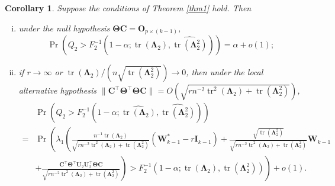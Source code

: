 \documentclass[12pt]{article} %
\DeclareMathOperator{\mytr}{tr}
\newcommand{\bC}{\mathbf{C}}
\newcommand{\bO}{\mathbf{O}}
\newcommand{\bI}{\mathbf{I}}
\newcommand{\bU}{\mathbf{U}}
\newcommand{\bW}{\mathbf{W}}
\newcommand{\bfsym}[1]{\ensuremath{\boldsymbol{#1}}}
\def\bLambda {\bfsym {\Lambda}}
\def\bTheta {\bfsym {\Theta}}
\newtheorem{corollary}{Corollary}
\theoremstyle{definition}
\begin{document}
\begin{corollary}
    Suppose the conditions of Theorem \ref{thm1} hold.
    Then
    \begin{enumerate}[(i)]
        \item 
            under the null hypothesis $\bTheta \bC=\bO_{p\times (k-1)}$,
\begin{equation*}
    \Pr
    \left(
        Q_2
    >
    F_2^{-1}\left(1-\alpha;\widehat{\mytr(\bLambda_2)},\widehat{\mytr(\bLambda_2^2)}\right)
\right)=\alpha +o(1)
        ;
\end{equation*}
        \item
            if $r\to \infty$ or $\mytr(\bLambda_2)/(n \sqrt{\mytr(\bLambda_2^2)})\to 0$, then under the local alternative hypothesis $\|\bC^\top \bTheta^\top \bTheta \bC\|=O(\sqrt{
        rn^{-2} \mytr^2 (\bLambda_2) + \mytr(\bLambda_2^2)
            })$,
\begin{equation*}
\begin{split}
    &\Pr
    \left(
        Q_2
    >
    F_2^{-1}\left(1-\alpha;\widehat{\mytr(\bLambda_2)},\widehat{\mytr(\bLambda_2^2)}\right)
\right)
\\
=
    &\Pr
    \left(
\lambda_1
\left(
\frac{
    n^{-1} \mytr(\bLambda_2)
}{
    \sqrt{
        rn^{-2} \mytr^2 (\bLambda_2) + \mytr(\bLambda_2^2)
    }
}
(\bW_{k-1}^* - r\bI_{k-1})
+
\frac{
    \sqrt{\mytr(\bLambda_2^2)}
}{
    \sqrt{
        rn^{-2} \mytr^2 (\bLambda_2) + \mytr(\bLambda_2^2)
    }
}
\bW_{k-1}
\right.\right.
\\
&
+\left.\left.
\frac{
    \bC^\top \bTheta^\top \bU_2 \bU_2^\top \bTheta \bC
}{
    \sqrt{
        rn^{-2} \mytr^2 (\bLambda_2) + \mytr(\bLambda_2^2)
    }
}
\right)
    >
    F_2^{-1}\left(1-\alpha;\mytr(\bLambda_2),\mytr(\bLambda_2^2)\right)
\right)
+o(1)
.
\end{split}
\end{equation*}
    \end{enumerate}
    \label{kuCor2}
\end{corollary}
\end{document}
